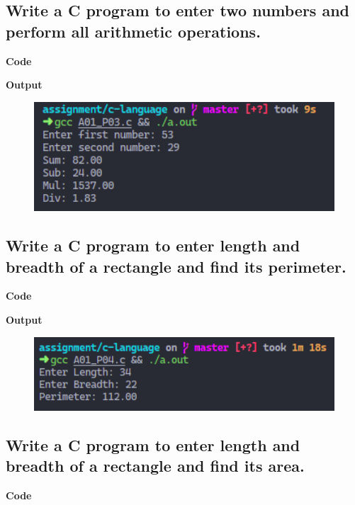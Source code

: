 \documentclass[a4paper]{article}
\begin{document}
\subsection{Write a C program to enter two numbers and perform all arithmetic operations.}
\textbf{Code}



\textbf{Output}

\begin{figure}[h]
  \includegraphics[width=12cm]{A01_P03}
\end{figure}

\newpage



\subsection{Write a C program to enter length and breadth of a rectangle and find its perimeter.}
\textbf{Code}



\textbf{Output}

\begin{figure}[h]
  \includegraphics[width=12cm]{A01_P04}
\end{figure}

\newpage



\subsection{Write a C program to enter length and breadth of a rectangle and find its area.}
\textbf{Code}
\end{document}
